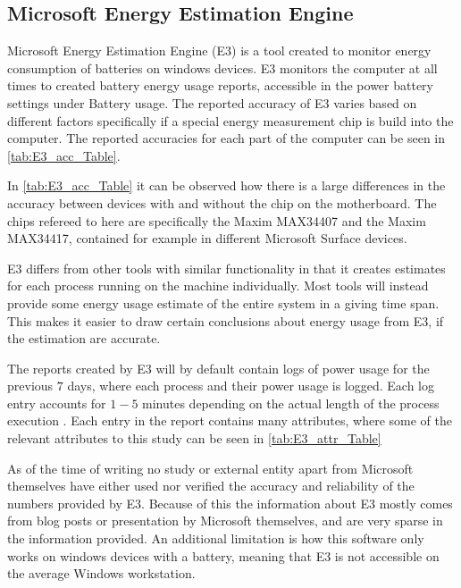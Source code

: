 \subsection{Microsoft Energy Estimation Engine}
Microsoft Energy Estimation Engine (E3) is a tool created to monitor energy consumption of batteries on windows devices. E3 monitors the computer at all times to created battery energy usage reports, accessible in the power battery settings under Battery usage.\cite[p.43]{E3WinHec}
The reported accuracy of E3 varies based on different factors specifically if a special energy measurement chip is build into the computer. The reported accuracies for each part of the computer can be seen in \cref{tab:E3_acc_Table}. 



In \cref*{tab:E3_acc_Table} it can be observed how there is a large differences in the accuracy between devices with and without the chip on the motherboard. The chips refereed to here are specifically the Maxim MAX34407 and the Maxim MAX34417, contained for example in different Microsoft Surface devices.


E3 differs from other tools with similar functionality in that it creates estimates for each process running on the machine individually. Most tools will instead provide some energy usage estimate of the entire system in a giving time span. This makes it easier to draw certain conclusions about energy usage from E3, if the estimation are accurate. 

The reports created by E3 will by default contain logs of power usage for the previous $7$ days, where each process and their power usage is logged. Each log entry accounts for $1-5$ minutes depending on the actual length of the process execution \cite[]{E3Video}. Each entry in the report contains many attributes, where some of the relevant attributes to this study can be seen in \cref{tab:E3_attr_Table}



As of the time of writing no study or external entity apart from Microsoft themselves have either used nor verified the accuracy and reliability of the numbers provided by E3. Because of this the information about E3 mostly comes from blog posts or presentation by Microsoft themselves, and are very sparse in the information provided. An additional limitation is how this software only works on windows devices with a battery, meaning that E3 is not accessible on the average Windows workstation.

